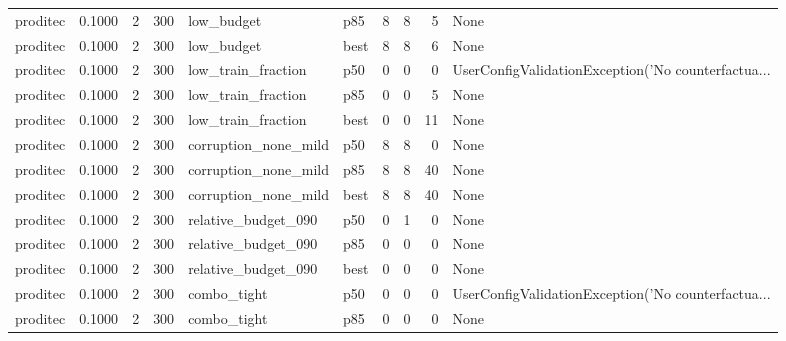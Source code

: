 \begin{tabular}{lrrrllrrrl}
proditec &    0.1000 &    2 &    300 &           low\_budget &    p85 &               8 &          8 &       5 &                                               None \\
proditec &    0.1000 &    2 &    300 &           low\_budget &   best &               8 &          8 &       6 &                                               None \\
proditec &    0.1000 &    2 &    300 &   low\_train\_fraction &    p50 &               0 &          0 &       0 & UserConfigValidationException('No counterfactua... \\
proditec &    0.1000 &    2 &    300 &   low\_train\_fraction &    p85 &               0 &          0 &       5 &                                               None \\
proditec &    0.1000 &    2 &    300 &   low\_train\_fraction &   best &               0 &          0 &      11 &                                               None \\
proditec &    0.1000 &    2 &    300 & corruption\_none\_mild &    p50 &               8 &          8 &       0 &                                               None \\
proditec &    0.1000 &    2 &    300 & corruption\_none\_mild &    p85 &               8 &          8 &      40 &                                               None \\
proditec &    0.1000 &    2 &    300 & corruption\_none\_mild &   best &               8 &          8 &      40 &                                               None \\
proditec &    0.1000 &    2 &    300 &  relative\_budget\_090 &    p50 &               0 &          1 &       0 &                                               None \\
proditec &    0.1000 &    2 &    300 &  relative\_budget\_090 &    p85 &               0 &          0 &       0 &                                               None \\
proditec &    0.1000 &    2 &    300 &  relative\_budget\_090 &   best &               0 &          0 &       0 &                                               None \\
proditec &    0.1000 &    2 &    300 &          combo\_tight &    p50 &               0 &          0 &       0 & UserConfigValidationException('No counterfactua... \\
proditec &    0.1000 &    2 &    300 &          combo\_tight &    p85 &               0 &          0 &       0 &                                               None \\

\end{tabular}

